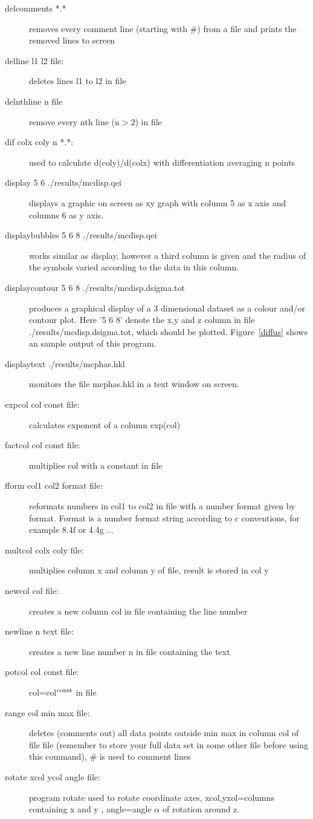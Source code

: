 \begin{description}
\item [\prg delcomments *.*] removes every comment line (starting with \#) from a file and %
prints the removed lines to screen
\item [\prg delline l1 l2 file:] deletes lines l1 to l2  in file
\item [\prg delnthline n file]  remove every nth line (n$>$2) in file
\item [\prg dif colx coly n *.*:] used to calculate d(coly)/d(colx) with %
differentiation averaging n points
\item [\prg display 5 6  ./results/mcdisp.qei] displays a graphic on screen as xy %
graph
with column 5 as x axis and columns 6 as y axis.
\item [\prg displaybubbles  5 6 8 ./results/mcdisp.qei] works similar as %
display, however
a third column is given and the radius of the symbols varied according to the data in 
this column.
\item [\prg displaycontour 5 6 8 ./results/mcdisp.dsigma.tot] produces a %
graphical
display of a 3 dimensional dataset as a colour and/or contour plot. Here '5 6 8' 
denote the x,y and z column in file {\prg ./results/mcdisp.dsigma.tot}, which should
be plotted. Figure~\ref{diffus} shows an sample output of this program.
\item [\prg displaytext ./results/mcphas.hkl] monitors the file mcphas.hkl in %
a text window
on screen.
\item [\prg expcol col const file:] calculates exponent of a column exp(col) 
\item [\prg factcol col const file:] multiplies col with a constant in file
\item [\prg fform col1 col2 format file:] reformats numbers in col1 to col2 in file %
with
             a number format given by format. Format is a number format string according
             to c conventions, for example 8.4f or 4.4g  ...             
\item [\prg multcol  colx coly file:] multiplies column x and column y of file, %
result is stored in col y
\item [\prg newcol col file:] creates a new column col in file containing the line %
number
\item [\prg newline n text file:] creates a new line number n  in file containing %
the text 
\item [\prg potcol col const file:]  col=col$^{\rm const}$ in file
\item [\prg range col min max file:] deletes (comments out) all data points outside %
min max in column  col of
                       file file (remember to store your full data set in some other
		       file before using this command), \# is used to comment lines
\item[\prg rotate xcol ycol angle file:]
program rotate  used to rotate coordinate axes,
 xcol,yxol=columns containing x and y , 
 angle=angle $\alpha$ of rotation around z.
 

\end{description}
